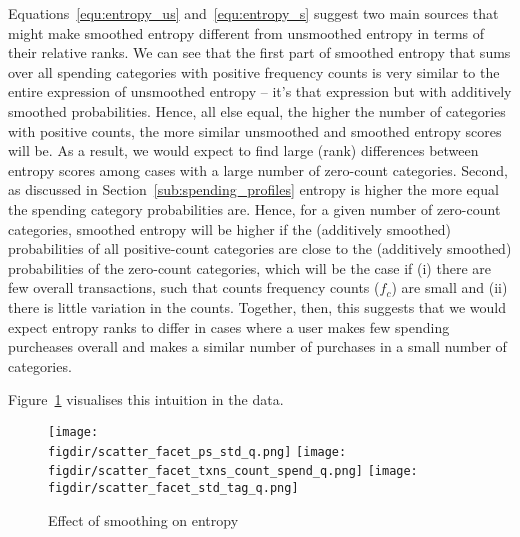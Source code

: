 Equations~\ref{equ:entropy_us} and~\ref{equ:entropy_s} suggest two main sources
that might make smoothed entropy different from unsmoothed entropy in terms of
their relative ranks. We can see that the first part of smoothed entropy that
sums over all spending categories with positive frequency counts is very
similar to the entire expression of unsmoothed entropy -- it's that expression
but with additively smoothed probabilities. Hence, all else equal, the higher
the number of categories with positive counts, the more similar unsmoothed and
smoothed entropy scores will be. As a result, we would expect to find large
(rank) differences between entropy scores among cases with a large number of
zero-count categories. Second, as discussed in
Section~\ref{sub:spending_profiles} entropy is higher the more equal the
spending category probabilities are. Hence, for a given number of zero-count
categories, smoothed entropy will be higher if the (additively smoothed)
probabilities of all positive-count categories are close to the (additively
smoothed) probabilities of the zero-count categories, which will be the case if
(i) there are few overall transactions, such that counts frequency counts
($f_c$) are small and (ii) there is little variation in the counts. Together,
then, this suggests that we would expect entropy ranks to differ in cases where
a user makes few spending purcheases overall and makes a similar number of
purchases in a small number of categories.

Figure~\ref{fig:scatter_facets} visualises this intuition in the data.

\begin{figure}[h]
    \centering 
    \caption{Effect of smoothing on entropy}
    \label{fig:scatter_facets}
    \texttt{[image: \\figdir/scatter\_facet\_ps\_std\_q.png]}
    \texttt{[image: \\figdir/scatter\_facet\_txns\_count\_spend\_q.png]}
    \texttt{[image: \\figdir/scatter\_facet\_std\_tag\_q.png]}
\end{figure}








